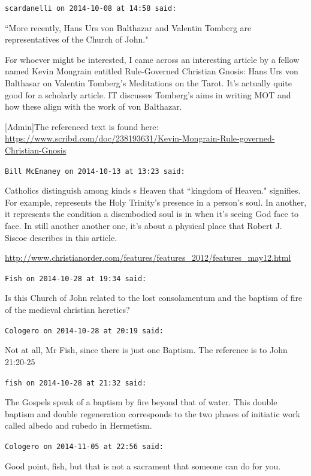 \begin{footnotesize}\begin{sffamily}



\texttt{scardanelli on 2014-10-08 at 14:58 said: }

``More recently, Hans Urs von Balthazar and Valentin Tomberg are representatives of the Church of John."

For whoever might be interested, I came across an interesting article by a fellow named Kevin Mongrain entitled
Rule-Governed Christian Gnosis: Hans Urs von Balthasar on Valentin Tomberg's Meditations on the
Tarot. It's actually quite good for a scholarly article. IT discusses
Tomberg's aims in writing MOT and how these align with the work of von Balthazar.

[Admin]The referenced text is found here: \url{https://www.scribd.com/doc/238193631/Kevin-Mongrain-Rule-governed-Christian-Gnosis}


\hfill

\texttt{Bill McEnaney on 2014-10-13 at 13:23 said: }

Catholics distinguish among kinds s Heaven that ``kingdom of Heaven." signifies. For example, represents the Holy
Trinity's presence in a person's soul. In another, it represents the
condition a disembodied soul is in when it's seeing God face to face. In still another another
one, it's about a physical place that Robert J. Siscoe describes in this article.

\url{http://www.christianorder.com/features/features\_2012/features\_may12.html}


\hfill

\texttt{Fish on 2014-10-28 at 19:34 said: }

Is this Church of John related to the lost consolamentum and the baptism of fire of the medieval christian heretics?


\hfill

\texttt{Cologero on 2014-10-28 at 20:19 said: }

Not at all, Mr Fish, since there is just one Baptism. The reference is to John 21:20-25


\hfill

\texttt{fish on 2014-10-28 at 21:32 said: }

The Gospels speak of a baptism by fire beyond that of water. This double baptism and double regeneration corresponds to
the two phases of initiatic work called albedo and rubedo in Hermetism.


\hfill

\texttt{Cologero on 2014-11-05 at 22:56 said: }

Good point, fish, but that is not a sacrament that someone can do for you.


\end{sffamily}\end{footnotesize}
